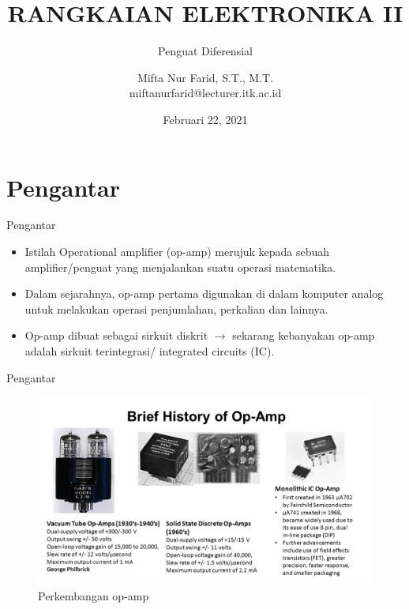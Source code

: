 \documentclass[aspectratio=169]{beamer}
\author{Mifta Nur Farid, S.T., M.T. \\
	miftanurfarid@lecturer.itk.ac.id}
\title{RANGKAIAN ELEKTRONIKA II}
\subtitle{Penguat Diferensial}
\institute{Teknik Elektro \\ Institut Teknologi Kalimantan \\ Balikpapan, Indonesia}
\date{\tiny Februari 22, 2021}
\begin{document}
\begin{frame}[t,plain]
\titlepage
\end{frame}


\section{Pengantar}
\begin{frame}{Pengantar}
	\begin{itemize}
		\item Istilah Operational amplifier (op-amp) merujuk kepada sebuah amplifier/penguat yang menjalankan suatu operasi matematika.
		\item Dalam sejarahnya, op-amp pertama digunakan di dalam komputer analog untuk melakukan operasi penjumlahan, perkalian dan lainnya.
		\item Op-amp dibuat sebagai sirkuit diskrit $ \rightarrow $ sekarang kebanyakan op-amp adalah sirkuit terintegrasi/ integrated circuits (IC). 
	\end{itemize}
\end{frame}

\begin{frame}{Pengantar}
	\begin{figure}
		\centering
		\includegraphics[height=0.75\textheight]{gambar/01.diff-amp/01.history-op-amp}
		\caption{Perkembangan op-amp}
		\label{fig:history-op-amp}
	\end{figure}
\end{frame}
\end{document}

